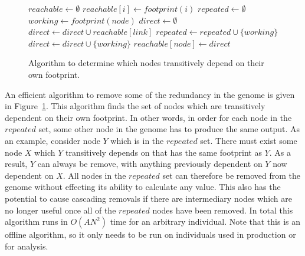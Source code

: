 \documentclass[journal]{IEEEtran}
\begin{document}
\begin{figure}
  \begin{algorithmic}
    \State $reachable \leftarrow \emptyset$
      \State $reachable[i] \leftarrow footprint(i)$
    \EndFor
    \State $repeated \leftarrow \emptyset$
      \State $working \leftarrow footprint(node)$
      \State $direct \leftarrow \emptyset$
        \State $direct \leftarrow direct \cup reachable[link]$
      \EndFor
        \State $repeated \leftarrow repeated \cup \{working\}$
      \Else
        \State $direct \leftarrow direct \cup \{working\}$
      \EndIf
      \State $reachable[node] \leftarrow direct$
    \EndFor
    \State{}
  \EndProcedure
  \end{algorithmic}
  \caption{Algorithm to determine which nodes transitively depend on their
  own footprint.}
  \label{fig:repeated}
\end{figure}

An efficient algorithm to remove some of the redundancy in the genome is given
in Figure~\ref{fig:repeated}.  This algorithm finds the set of nodes which are
transitively dependent on their own footprint.  In other words, in order for
each node in the $repeated$ set, some other node in the genome has to produce
the same output.  As an example, consider node $Y$ which is in the $repeated$
set.  There must exist some node $X$ which $Y$ transitively depends on that has
the same footprint as $Y$.  As a result, $Y$ can always be remove, with anything
previously dependent on $Y$ now dependent on $X$.  All nodes in the $repeated$
set can therefore be removed from the genome without effecting its ability to
calculate any value.  This also has the potential to cause cascading removals
if there are intermediary nodes which are no longer useful once all of the
$repeated$ nodes have been removed.  In total this algorithm runs in $O(AN^2)$
time for an arbitrary individual.  Note that this is an offline algorithm,
so it only needs to be run on individuals used in production or for analysis.
\end{document}
